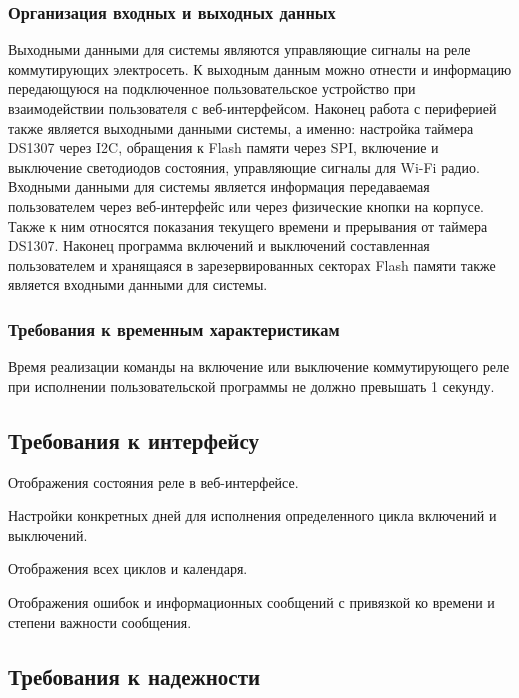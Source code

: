 \subsubsection{Организация входных и выходных данных}
Выходными данными для системы являются управляющие сигналы на реле коммутирующих электросеть. К выходным данным можно отнести и информацию передающуюся на подключенное пользовательское устройство при взаимодействии пользователя с веб-интерфейсом. Наконец работа с периферией также является выходными данными системы, а именно: настройка таймера DS1307 через I2C, обращения к Flash памяти через SPI, включение и выключение светодиодов состояния, управляющие сигналы для Wi-Fi радио. Входными данными для системы является информация передаваемая пользователем через веб-интерфейс или через физические кнопки на корпусе. Также к ним относятся показания текущего времени и прерывания от таймера DS1307. Наконец программа включений и выключений составленная пользователем и хранящаяся в зарезервированных секторах Flash памяти также является входными данными для системы.

\subsubsection{Требования к временным характеристикам}
Время реализации команды на включение или выключение коммутирующего реле при исполнении пользовательской программы не должно превышать 1 секунду.



\subsection{Требования к интерфейсу}
\begin{my_enumerate}
\item Отображения состояния реле в веб-интерфейсе.
\item Настройки конкретных дней для исполнения определенного цикла включений и выключений.
\item Отображения всех циклов и календаря.
\item Отображения ошибок и информационных сообщений с привязкой ко времени и степени важности сообщения.
\end{my_enumerate}


\subsection{Требования к надежности}
